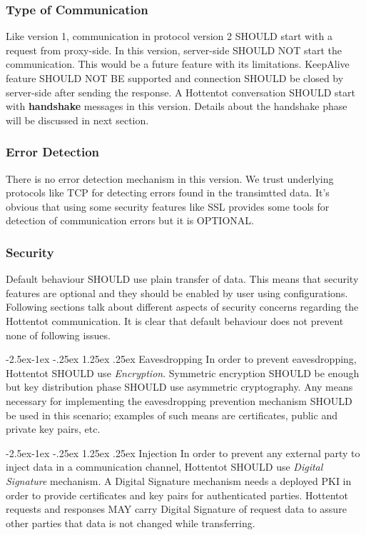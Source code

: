 \documentclass[10pt,a4paper]{article}
\makeatletter
\renewcommand\paragraph{\@startsection{paragraph}{4}{\z@}%
            {-2.5ex\@plus -1ex \@minus -.25ex}%
            {1.25ex \@plus .25ex}%
            {\normalfont\normalsize\bfseries}}
\makeatother
\begin{document}
\subsubsection{Type of Communication}
Like version 1, communication in protocol version 2 SHOULD start with a request from proxy-side. In this version, server-side SHOULD NOT start the communication. This would be a future feature with its limitations. KeepAlive feature SHOULD NOT BE supported and connection SHOULD be closed by server-side after sending the response. A Hottentot conversation SHOULD start with \textbf{handshake} messages in this version. Details about the handshake phase will be discussed in next section.

\subsubsection{Error Detection}
There is no error detection mechanism in this version. We trust underlying protocols like TCP for detecting errors found in the transimtted data. It's obvious that using some security features like SSL provides some tools for detection of communication errors but it is OPTIONAL.

\subsubsection{Security}
Default behaviour SHOULD use plain transfer of data. This means that security features are optional and they should be enabled by user using configurations. Following sections talk about different aspects of security concerns regarding the Hottentot communication. It is clear that default behaviour does not prevent none of following issues.

\paragraph{Eavesdropping}
In order to prevent eavesdropping, Hottentot SHOULD use \textit{Encryption}. Symmetric encryption SHOULD be enough but key distribution phase SHOULD use asymmetric cryptography. Any means necessary for implementing the eavesdropping prevention mechanism SHOULD be used in this scenario; examples of such means are certificates, public and private key pairs, etc.

\paragraph{Injection}
In order to prevent any external party to inject data in a communication channel, Hottentot SHOULD use \textit{Digital Signature} mechanism. A Digital Signature mechanism needs a deployed PKI in order to provide certificates and key pairs for authenticated parties. Hottentot requests and responses MAY carry Digital Signature of request data to assure other parties that data is not changed while transferring.
\end{document}
